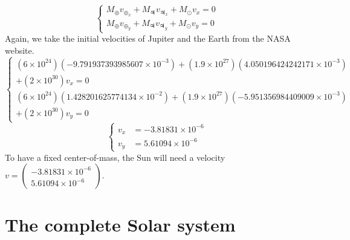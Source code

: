 \documentclass[a4paper, twoside, 11pt]{report}
\theoremstyle{theorem}
\theoremstyle{remark}
\theoremstyle{exemple}
\begin{document}
                \begin{equation*}
                    \left\{
                        \begin{aligned}
                            M_{\oplus} v_{\oplus_x} + M_{\jupiter} v_{\jupiter_x} + M_{\odot} v_x = 0 \\
                            M_{\oplus} v_{\oplus_y} + M_{\jupiter} v_{\jupiter_y} + M_{\odot} v_y = 0
                        \end{aligned}
                    \right.
                \end{equation*}
                Again, we take the initial velocities of Jupiter and the Earth from the NASA website.
                \begin{equation*}
                    \left\{
                        \begin{aligned}
                            (6\times 10^{24}) (-9.791937393985607 \times 10^{-3}) + (1.9 \times 10^{27}) (4.050196424242171 \times 10^{-3})& \\
                            + (2 \times 10^{30}) v_x = 0& \\
                            (6\times 10^{24}) (1.428201625774134\times 10^{-2}) + (1.9 \times 10^{27}) (-5.951356984409009 \times 10^{-3})& \\
                            + (2 \times 10^{30}) v_y = 0&
                        \end{aligned}
                    \right.
                \end{equation*}
                \begin{equation*}
                    \left\{
                        \begin{aligned}
                            v_x &= -3.81831 \times 10^{-6}\\
                            v_y &= 5.61094 \times 10^{-6}
                        \end{aligned}
                    \right.
                    \tag{6}
                \end{equation*}
            To have a fixed center-of-mass, the Sun will need a velocity $v =
            \left(\begin{array}{c}
                -3.81831 \times 10^{-6}\\
                5.61094 \times 10^{-6}
            \end{array} \right)$.                 
    

    \section{The complete Solar system}
\end{document}
